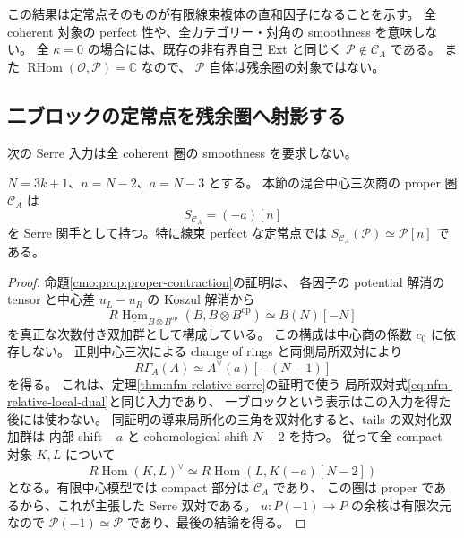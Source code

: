 \begin{remark}[判定の範囲]
この結果は定常点そのものが有限線束複体の直和因子になることを示す。
全 coherent 対象の perfect 性や、全カテゴリー・対角の smoothness を意味しない。
全 $\kappa=0$ の場合には、既存の非有界自己 Ext と同じく
$\mathcal P\notin\mathcal C_A$ である。
また $\operatorname{RHom}(\mathcal O,\mathcal P)=\mathbb C$ なので、
$\mathcal P$ 自体は残余圏の対象ではない。
\end{remark}

\subsection{二ブロックの定常点を残余圏へ射影する}

次の Serre 入力は全 coherent 圏の smoothness を要求しない。

\begin{lemma}
\label{cmo:lem:mixed-line-serre}
$N=3k+1$、$n=N-2$、$a=N-3$ とする。
本節の混合中心三次商の proper 圏 $\mathcal C_A$ は
\[
 S_{\mathcal C_A}=(-a)[n]
\]
を Serre 関手として持つ。特に線束 perfect な定常点では
$S_{\mathcal C_A}(\mathcal P)\simeq\mathcal P[n]$ である。
\end{lemma}
\begin{proof}
命題\ref{cmo:prop:proper-contraction}の証明は、
各因子の potential 解消の tensor と中心差 $u_L-u_R$ の Koszul 解消から
\[
 R\underline{\operatorname{Hom}}_{B\otimes B^{\mathrm{op}}}
     (B,B\otimes B^{\mathrm{op}})\simeq B(N)[-N]
\]
を真正な次数付き双加群として構成している。
この構成は中心商の係数 $c_0$ に依存しない。
正則中心三次による change of rings と両側局所双対により
\[
 R\Gamma_A(A)\simeq A^\vee(a)[-(N-1)]
\]
を得る。
これは、定理\ref{thm:nfm-relative-serre}の証明で使う
局所双対式\eqref{eq:nfm-relative-local-dual}と同じ入力であり、
一ブロックという表示はこの入力を得た後には使わない。
同証明の導来局所化の三角を双対化すると、tails の双対化双加群は
内部 shift $-a$ と cohomological shift $N-2$ を持つ。
従って全 compact 対象 $K,L$ について
\[
 R\operatorname{Hom}(K,L)^\vee
 \simeq R\operatorname{Hom}(L,K(-a)[N-2])
\]
となる。有限中心模型では compact 部分は $\mathcal C_A$ であり、
この圏は proper であるから、これが主張した Serre 双対である。
$u:P(-1)\to P$ の余核は有限次元なので
$\mathcal P(-1)\simeq\mathcal P$ であり、最後の結論を得る。
\end{proof}


